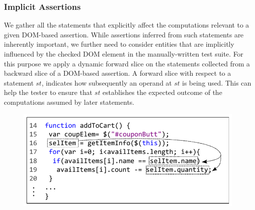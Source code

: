 \subsubsection{Implicit Assertions} \label{Sec:implicitAssertions}
We gather all the statements that explicitly affect the computations relevant to a given DOM-based assertion. While assertions inferred from such statements are inherently important, we further need to consider entities that are implicitly influenced by the checked DOM element in the manually-written test suite. For this purpose we apply a dynamic forward slice on the statements collected from a backward slice of a DOM-based assertion.
A forward slice with respect to a statement $st$,
indicates how subsequently an operand at $st$ is being used. This can help the tester to ensure that $st$ establishes the expected outcome of the computations assumed by later statements. 

\begin{figure}[!t]
  \centering
  \includegraphics[width=1\hsize]{fig/forwardSlicingExample}
   \vspace{-0.2in} 
  \label{Fig:forwardSlicingExample}
\end{figure}

